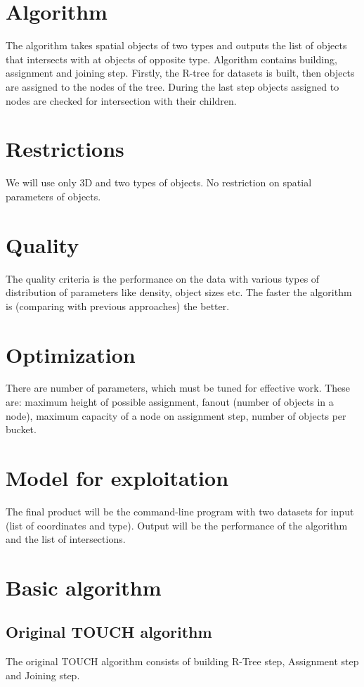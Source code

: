 \documentclass{sig-alternate}
\begin{document}
\section{Algorithm}
The algorithm takes spatial objects of two types and outputs the list of objects that intersects with at objects of opposite type. Algorithm contains building, assignment and joining step. Firstly, the R-tree for datasets is built, then objects are assigned to the nodes of the tree. During the last step objects assigned to nodes are checked for intersection with their children.

\section{Restrictions}
We will use only 3D and two types of objects. No restriction on spatial parameters of objects.

\section{Quality}
The quality criteria is the performance on the data with various types of distribution of parameters like density, object sizes etc. The faster the algorithm is (comparing with previous approaches) the better.

\section{Optimization}
There are number of parameters, which must be tuned for effective work. These are: maximum height of possible assignment, fanout (number of objects in a node), maximum capacity of a node on assignment step, number of objects per bucket.

\section{Model for exploitation}
The final product will be the command-line program with two datasets for input (list of coordinates and type). Output will be the performance of the algorithm and the list of intersections.

\section{Basic algorithm}

\subsection{Original TOUCH algorithm}
The original TOUCH algorithm consists of building R-Tree step, Assignment step and Joining step.
\end{document}
